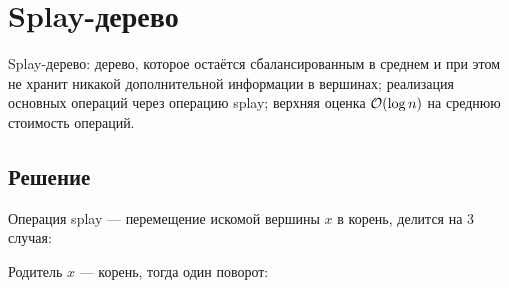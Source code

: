 \section{Splay-дерево}
Splay-дерево: дерево, которое остаётся сбалансированным
в среднем и при этом не хранит никакой
дополнительной информации в вершинах;
реализация основных операций через операцию splay;
верхняя оценка $\mathcal{O}(\log n)$ на среднюю стоимость операций.

\subsection{Решение}
Операция splay --- перемещение
искомой вершины $x$ в корень,
делится на 3 случая:

\noindent
\begin{minipage}{\textwidth}
    Родитель $x$ --- корень,
    тогда один поворот:

    \begin{center}
    \end{center}
\end{minipage}

\vspace{3em}

